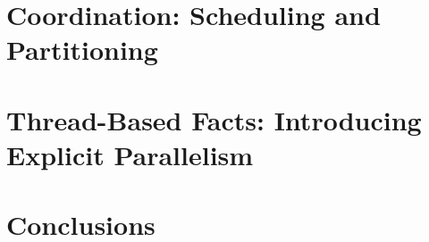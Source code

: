 \documentclass[12pt]{cmuthesis}
\theoremstyle{indented}
\begin{document}
\chapter{Coordination: Scheduling and Partitioning}\label{chapter:coordination}


\chapter{Thread-Based Facts: Introducing Explicit Parallelism}



\chapter{Conclusions}


\appendix


\backmatter


\renewcommand{\bibsection}{\chapter{\bibname}}

\end{document}
